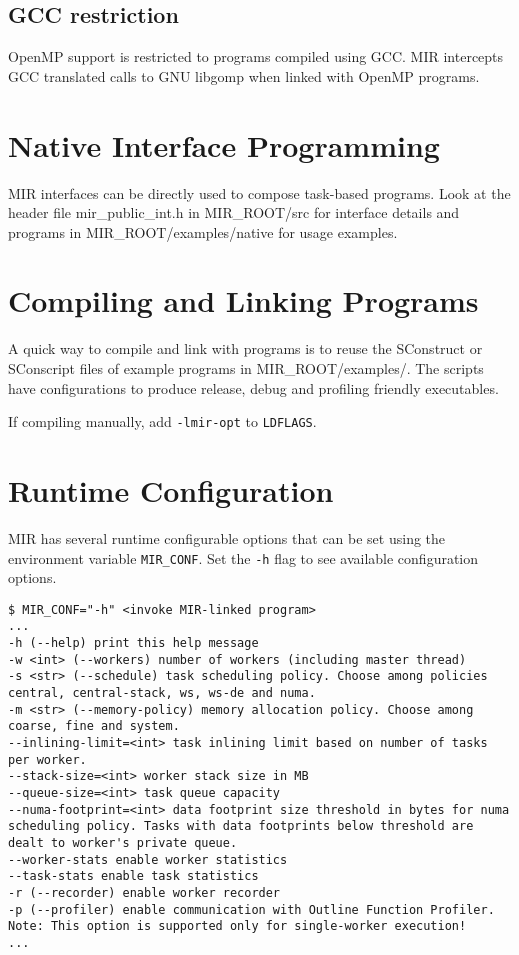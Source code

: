 \documentclass[11pt,a4paper]{article}
\begin{document}
\subsection{GCC restriction}
\label{sec:GCC-restriction}

OpenMP support is restricted to programs compiled using GCC. MIR intercepts GCC translated calls to GNU libgomp when linked with OpenMP programs.

\section{Native Interface Programming}\label{sec:native-interface-programming}

MIR interfaces can be directly used to compose task-based programs. Look at the header file \textsf{mir\_public\_int.h} in \textsf{MIR\_ROOT/src} for interface details and programs in \textsf{MIR\_ROOT/examples/native} for usage examples.

\section{Compiling and Linking Programs}\label{sec:compiling-and-linking}

A quick way to compile and link with programs is to reuse the \textsf{SConstruct} or \textsf{SConscript} files of example programs in \textsf{MIR\_ROOT/examples/}.
The scripts have configurations to produce release, debug and profiling friendly executables.

If compiling manually, add \texttt{-lmir-opt} to \texttt{LDFLAGS}.

\section{Runtime Configuration}\label{sec:runtime-configuration}

MIR has several runtime configurable options that can be set using the environment variable \texttt{MIR\_CONF}. Set the \texttt{-h} flag to see available configuration options.

\begin{lstlisting}[style=MyInputStyle]
$ MIR_CONF="-h" <invoke MIR-linked program>
...
-h (--help) print this help message
-w <int> (--workers) number of workers (including master thread)
-s <str> (--schedule) task scheduling policy. Choose among policies central, central-stack, ws, ws-de and numa.
-m <str> (--memory-policy) memory allocation policy. Choose among coarse, fine and system.
--inlining-limit=<int> task inlining limit based on number of tasks per worker.
--stack-size=<int> worker stack size in MB
--queue-size=<int> task queue capacity
--numa-footprint=<int> data footprint size threshold in bytes for numa scheduling policy. Tasks with data footprints below threshold are dealt to worker's private queue.
--worker-stats enable worker statistics
--task-stats enable task statistics
-r (--recorder) enable worker recorder
-p (--profiler) enable communication with Outline Function Profiler. Note: This option is supported only for single-worker execution!
...
\end{lstlisting}
\end{document}
